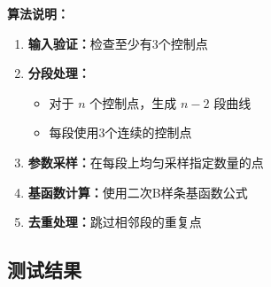 \documentclass[12pt,a4paper]{article}
\begin{document}
\textbf{算法说明：}

\begin{enumerate}
\item \textbf{输入验证：}检查至少有3个控制点
\item \textbf{分段处理：}
  \begin{itemize}
  \item 对于 $n$ 个控制点，生成 $n-2$ 段曲线
  \item 每段使用3个连续的控制点
  \end{itemize}
\item \textbf{参数采样：}在每段上均匀采样指定数量的点
\item \textbf{基函数计算：}使用二次B样条基函数公式
\item \textbf{去重处理：}跳过相邻段的重复点
\end{enumerate}

\subsection{测试结果}
\end{document}
